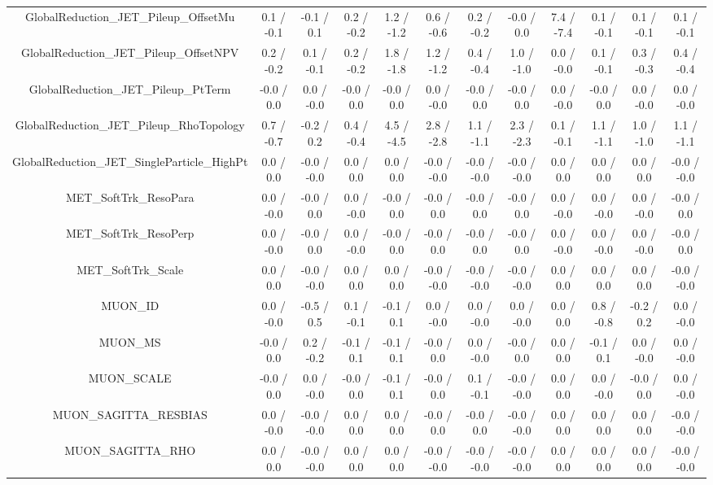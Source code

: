 \begin{table}[htbp]
\begin{center}
\begin{tabular}{|c|c|c|c|c|c|c|c|c|c|c|c|}
  GlobalReduction_JET_Pileup_OffsetMu & 0.1 / -0.1 & -0.1 / 0.1 & 0.2 / -0.2 & 1.2 / -1.2 & 0.6 / -0.6 & 0.2 / -0.2 & -0.0 / 0.0 & 7.4 / -7.4 & 0.1 / -0.1 & 0.1 / -0.1 & 0.1 / -0.1 \\ 
  GlobalReduction_JET_Pileup_OffsetNPV & 0.2 / -0.2 & 0.1 / -0.1 & 0.2 / -0.2 & 1.8 / -1.8 & 1.2 / -1.2 & 0.4 / -0.4 & 1.0 / -1.0 & 0.0 / -0.0 & 0.1 / -0.1 & 0.3 / -0.3 & 0.4 / -0.4 \\ 
  GlobalReduction_JET_Pileup_PtTerm & -0.0 / 0.0 & 0.0 / -0.0 & -0.0 / 0.0 & -0.0 / 0.0 & 0.0 / -0.0 & -0.0 / 0.0 & -0.0 / 0.0 & 0.0 / -0.0 & -0.0 / 0.0 & 0.0 / -0.0 & 0.0 / -0.0 \\ 
  GlobalReduction_JET_Pileup_RhoTopology & 0.7 / -0.7 & -0.2 / 0.2 & 0.4 / -0.4 & 4.5 / -4.5 & 2.8 / -2.8 & 1.1 / -1.1 & 2.3 / -2.3 & 0.1 / -0.1 & 1.1 / -1.1 & 1.0 / -1.0 & 1.1 / -1.1 \\ 
  GlobalReduction_JET_SingleParticle_HighPt & 0.0 / 0.0 & -0.0 / -0.0 & 0.0 / 0.0 & 0.0 / 0.0 & -0.0 / -0.0 & -0.0 / -0.0 & -0.0 / -0.0 & 0.0 / 0.0 & 0.0 / 0.0 & 0.0 / 0.0 & -0.0 / -0.0 \\ 
  MET_SoftTrk_ResoPara & 0.0 / -0.0 & -0.0 / 0.0 & 0.0 / -0.0 & -0.0 / 0.0 & -0.0 / 0.0 & -0.0 / 0.0 & -0.0 / 0.0 & 0.0 / -0.0 & 0.0 / -0.0 & 0.0 / -0.0 & -0.0 / 0.0 \\ 
  MET_SoftTrk_ResoPerp & 0.0 / -0.0 & -0.0 / 0.0 & 0.0 / -0.0 & -0.0 / 0.0 & -0.0 / 0.0 & -0.0 / 0.0 & -0.0 / 0.0 & 0.0 / -0.0 & 0.0 / -0.0 & 0.0 / -0.0 & -0.0 / 0.0 \\ 
  MET_SoftTrk_Scale & 0.0 / 0.0 & -0.0 / -0.0 & 0.0 / 0.0 & 0.0 / 0.0 & -0.0 / -0.0 & -0.0 / -0.0 & -0.0 / -0.0 & 0.0 / 0.0 & 0.0 / 0.0 & 0.0 / 0.0 & -0.0 / -0.0 \\ 
  MUON_ID & 0.0 / -0.0 & -0.5 / 0.5 & 0.1 / -0.1 & -0.1 / 0.1 & 0.0 / -0.0 & 0.0 / -0.0 & 0.0 / -0.0 & 0.0 / 0.0 & 0.8 / -0.8 & -0.2 / 0.2 & 0.0 / -0.0 \\ 
  MUON_MS & -0.0 / 0.0 & 0.2 / -0.2 & -0.1 / 0.1 & -0.1 / 0.1 & -0.0 / 0.0 & 0.0 / -0.0 & -0.0 / 0.0 & 0.0 / 0.0 & -0.1 / 0.1 & 0.0 / -0.0 & 0.0 / -0.0 \\ 
  MUON_SCALE & -0.0 / 0.0 & 0.0 / -0.0 & -0.0 / 0.0 & -0.1 / 0.1 & -0.0 / 0.0 & 0.1 / -0.1 & -0.0 / -0.0 & 0.0 / 0.0 & 0.0 / -0.0 & -0.0 / 0.0 & 0.0 / -0.0 \\ 
  MUON_SAGITTA_RESBIAS & 0.0 / -0.0 & -0.0 / -0.0 & 0.0 / 0.0 & 0.0 / 0.0 & -0.0 / 0.0 & -0.0 / 0.0 & -0.0 / -0.0 & 0.0 / 0.0 & 0.0 / 0.0 & 0.0 / 0.0 & -0.0 / -0.0 \\ 
  MUON_SAGITTA_RHO & 0.0 / 0.0 & -0.0 / -0.0 & 0.0 / 0.0 & 0.0 / 0.0 & -0.0 / -0.0 & -0.0 / -0.0 & -0.0 / -0.0 & 0.0 / 0.0 & 0.0 / 0.0 & 0.0 / 0.0 & -0.0 / -0.0 \\ 

\end{tabular}
\end{center}
\end{table}
